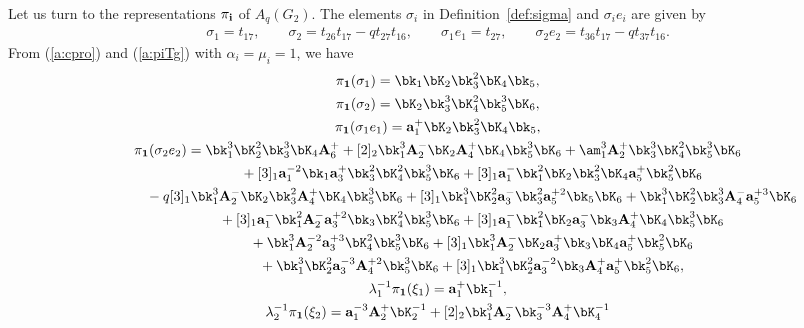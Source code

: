 Let us turn to the representations $\pi_{{\bf i}}$ of $A_q(G_2)$.
The elements $\sigma_i$ in Def\/inition~\ref{def:sigma}
and $\sigma_ie_i$
are given by
\begin{gather}\label{g:kobetsu}
\sigma_1 = t_{17}, \qquad
\sigma_2 = t_{26}t_{17}-qt_{27}t_{16},\qquad
\sigma_1 e_1 = t_{27},\qquad
\sigma_2e_2 = t_{36}t_{17}-qt_{37}t_{16}.
\end{gather}
From (\ref{a:cpro}) and (\ref{a:piTg}) with $\alpha_i=\mu_i=1$, we have
\begin{gather*}
\pi_{\bf 1}(\sigma_1)=\bk_1 \bK_2 \bk^{2}_3 \bK_4 \bk_5,\\
\pi_{\bf 1}(\sigma_2)=\bK_2 \bk^{3}_3 \bK^{2}_4 \bk^{3}_5 \bK_6,\\
\pi_{\bf 1}(\sigma_1e_1)={\bf a}^+_1 \bK_2 \bk^{2}_3 \bK_4 \bk_5,\\
\pi_{\bf 1}(\sigma_2e_2)=\bk^{3}_1 \bK^{2}_2 \bk^{3}_3 \bK_4 {\bf A}^+_6
 + [2]_2 \bk^{3}_1 {\bf A}^-_2 \bK_2 {\bf A}^+_4 \bK_4 \bk^{3}_5 \bK_6
 + \am_1^3 {\bf A}^+_2 \bk^{3}_3 \bK^{2}_4 \bk^{3}_5 \bK_6\\
 \hphantom{\pi_{\bf 1}(\sigma_2e_2)=}{}
 + [3]_1 {\bf a}_1^{-2} \bk_1 {\bf a}^+_3 \bk^{2}_3 \bK^{2}_4 \bk^{3}_5 \bK_6
 + [3]_1 {\bf a}^-_1 \bk^{2}_1 \bK_2 \bk^{2}_3 \bK_4 {\bf a}^+_5 \bk^{2}_5 \bK_6\\
 \hphantom{\pi_{\bf 1}(\sigma_2e_2)=}{}
 - q [3]_1 \bk^{3}_1 {\bf A}^-_2 \bK_2 \bk^{2}_3 {\bf A}^+_4 \bK_4 \bk^{3}_5 \bK_6
 + [3]_1 \bk^{3}_1 \bK^{2}_2 {\bf a}^-_3 \bk^{2}_3 {\bf a}_5^{+2} \bk_5 \bK_6
 + \bk^{3}_1 \bK^{2}_2 \bk^{3}_3 {\bf A}^-_4 {\bf a}_5^{+3} \bK_6\\
 \hphantom{\pi_{\bf 1}(\sigma_2e_2)=}{}
 + [3]_1 {\bf a}^-_1 \bk^{2}_1 {\bf A}^-_2 {\bf a}_3^{+2} \bk_3 \bK^{2}_4 \bk^{3}_5 \bK_6
 + [3]_1 {\bf a}^-_1 \bk^{2}_1 \bK_2 {\bf a}^-_3 \bk_3 {\bf A}^+_4 \bK_4 \bk^{3}_5 \bK_6\\
\hphantom{\pi_{\bf 1}(\sigma_2e_2)=}{}
 + \bk^{3}_1 {\bf A}_2^{-2} {\bf a}_3^{+3} \bK^{2}_4 \bk^{3}_5 \bK_6
 + [3]_1 \bk^{3}_1 {\bf A}^-_2 \bK_2 {\bf a}^+_3 \bk_3 \bK_4 {\bf a}^+_5 \bk^{2}_5 \bK_6\\
\hphantom{\pi_{\bf 1}(\sigma_2e_2)=}{}
 + \bk^{3}_1 \bK^{2}_2 {\bf a}_3^{-3} {\bf A}_4^{+2} \bk^{3}_5 \bK_6
 + [3]_1 \bk^{3}_1 \bK^{2}_2 {\bf a}_3^{-2} \bk_3 {\bf A}^+_4 {\bf a}^+_5 \bk^{2}_5 \bK_6,\\
\lambda_1^{-1}\pi_{\bf 1}(\xi_1)={\bf a}^+_1 \bk^{-1}_1,\\
\lambda_2^{-1}\pi_{\bf 1}(\xi_2)={\bf a}_1^{-3} {\bf A}^+_2 \bK^{-1}_2
 + [2]_2 \bk^{3}_1 {\bf A}^-_2 \bk^{-3}_3 {\bf A}^+_4 \bK^{-1}_4

\end{gather*}
